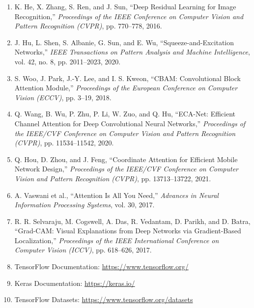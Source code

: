\documentclass[10pt]{article}
\begin{document}
\begin{enumerate}

\item
K. He, X. Zhang, S. Ren, and J. Sun,
``Deep Residual Learning for Image Recognition,''
\textit{Proceedings of the IEEE Conference on Computer Vision and Pattern
Recognition (CVPR)}, pp. 770--778, 2016.

\item
J. Hu, L. Shen, S. Albanie, G. Sun, and E. Wu,
``Squeeze-and-Excitation Networks,''
\textit{IEEE Transactions on Pattern Analysis and Machine Intelligence},
vol. 42, no. 8, pp. 2011--2023, 2020.

\item
S. Woo, J. Park, J.-Y. Lee, and I. S. Kweon,
``CBAM: Convolutional Block Attention Module,''
\textit{Proceedings of the European Conference on Computer Vision (ECCV)},
pp. 3--19, 2018.

\item
Q. Wang, B. Wu, P. Zhu, P. Li, W. Zuo, and Q. Hu,
``ECA-Net: Efficient Channel Attention for Deep Convolutional Neural
Networks,''
\textit{Proceedings of the IEEE/CVF Conference on Computer Vision and Pattern
Recognition (CVPR)}, pp. 11534--11542, 2020.

\item
Q. Hou, D. Zhou, and J. Feng,
``Coordinate Attention for Efficient Mobile Network Design,''
\textit{Proceedings of the IEEE/CVF Conference on Computer Vision and Pattern
Recognition (CVPR)}, pp. 13713--13722, 2021.

\item
A. Vaswani et al.,
``Attention Is All You Need,''
\textit{Advances in Neural Information Processing Systems},
vol. 30, 2017.

\item
R. R. Selvaraju, M. Cogswell, A. Das, R. Vedantam,
D. Parikh, and D. Batra,
``Grad-CAM: Visual Explanations from Deep Networks via
Gradient-Based Localization,''
\textit{Proceedings of the IEEE International Conference on Computer Vision
(ICCV)}, pp. 618--626, 2017.

\item
TensorFlow Documentation:
\url{https://www.tensorflow.org/}

\item
Keras Documentation:
\url{https://keras.io/}

\item
TensorFlow Datasets:
\url{https://www.tensorflow.org/datasets}

\end{enumerate}
\end{document}
